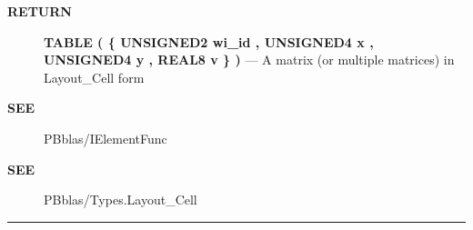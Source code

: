 \par
\begin{description}
\item [\colorbox{tagtype}{\color{white} \textbf{\textsf{RETURN}}}] \textbf{TABLE ( \{ UNSIGNED2 wi\_id , UNSIGNED4 x , UNSIGNED4 y , REAL8 v \} )} --- A matrix (or multiple matrices) in Layout\_Cell form
\end{description}







\par
\begin{description}
\item [\colorbox{tagtype}{\color{white} \textbf{\textsf{SEE}}}] PBblas/IElementFunc
\item [\colorbox{tagtype}{\color{white} \textbf{\textsf{SEE}}}] PBblas/Types.Layout\_Cell
\end{description}



\rule{\linewidth}{0.5pt}
